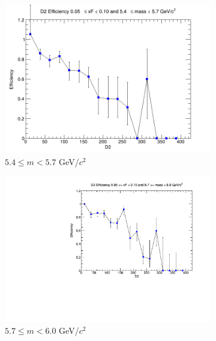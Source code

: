 \documentclass[11pt]{article}
\begin{document}
\begin{figure}[p]
\begin{subfigure}[b]{0.32\textwidth}
        \includegraphics[width=\textwidth]{./kTrackerEfficiencyPlots/D2_Efficiency_xF1_mass4.png}
        \caption{$5.4 \leq m < 5.7$ GeV/$c^2$}
    \end{subfigure}\hfill
    \begin{subfigure}[b]{0.32\textwidth}
        \centering
        \includegraphics[width=\textwidth]{./kTrackerEfficiencyPlots/D2_Efficiency_xF1_mass5.pdf}
        \caption{$5.7 \leq m < 6.0$ GeV/$c^2$}
    \end{subfigure}\vspace{0.5cm}
    \begin{subfigure}[b]{0.32\textwidth}
        \centering

\end{subfigure}
\end{figure}
\end{document}
